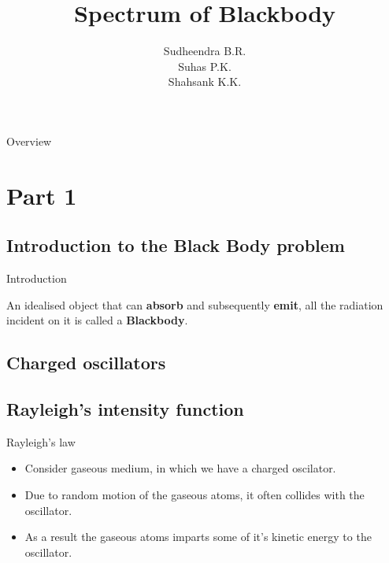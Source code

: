 \documentclass[aspectratio=169]{beamer}
\title{Spectrum of Blackbody}
\institute{Guided by V.H. Belvadi \\ Yuvaraja's College, Mysuru}
\author{Sudheendra B.R. \\ Suhas P.K. \\ Shahsank K.K.}
\date{}
\newcommand{\highlight}[1]{\textbf{#1}}
\begin{document}
\begin{frame}[noframenumbering]
	\titlepage
\end{frame}

\begin{frame}[noframenumbering]{Overview}

		\tableofcontents[sections={1}] 
		
\end{frame}

\begin{frame}

		\tableofcontents[sections={2-3}]
		 
\end{frame}


\section{Part 1}

\subsection{Introduction to the Black Body problem}

\begin{frame}{Introduction}

{\large An idealised object that can \highlight{absorb} and subsequently \highlight{emit}, all the radiation incident on it is called a \highlight{Blackbody}.}

\end{frame}

\subsection{Charged oscillators}
 
\subsection{Rayleigh's intensity function}

\begin{frame}{Rayleigh's law}

	\begin{itemize}
		
		\item Consider gaseous medium, in which we have a charged oscilator. \newline
		\item Due to random motion of the gaseous atoms, it often collides with the oscillator. \pause \newline
		\item As a result the gaseous atoms imparts some of it's kinetic energy to the oscillator.
		
	\end{itemize}
	
\end{frame}
\end{document}
